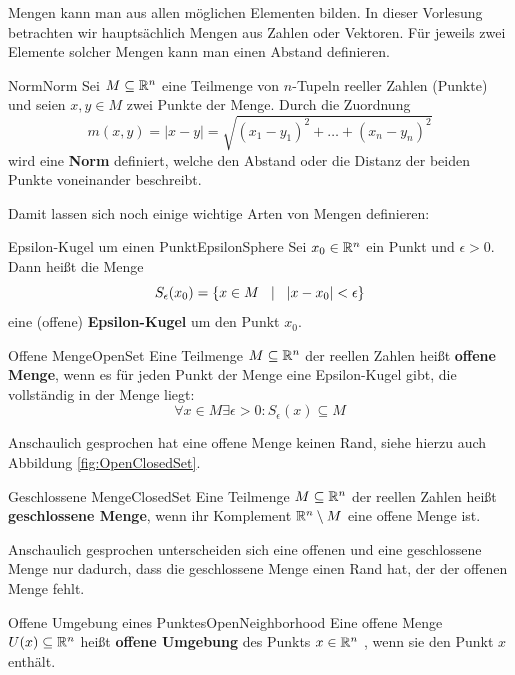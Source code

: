 Mengen kann man aus allen möglichen Elementen bilden. In dieser Vorlesung betrachten wir hauptsächlich Mengen aus Zahlen oder Vektoren. Für jeweils zwei Elemente solcher Mengen kann man einen Abstand definieren.

\begin{definition}{Norm}{Norm}
    Sei $M \subseteq \mathbb{R}^n$ eine Teilmenge von $n$-Tupeln reeller Zahlen (Punkte) und seien $x,y\in M$ zwei Punkte der Menge. Durch die Zuordnung
    $$
        m(x,y) = |x-y| = \sqrt{(x_1-y_1)^2 + \dots + (x_n-y_n)^2}
    $$
    wird eine \textbf{Norm} definiert, welche den Abstand oder die Distanz der beiden Punkte voneinander beschreibt.
\end{definition}

Damit lassen sich noch einige wichtige Arten von Mengen definieren:

\begin{definition}{Epsilon-Kugel um einen Punkt}{EpsilonSphere}
    Sei $x_0\in\mathbb{R}^n$ ein Punkt und $\epsilon > 0$. Dann heißt die Menge
    $$
        S_\epsilon(x_0) = \lbrace x \in M \hspace{3mm} | \hspace{3mm} |x-x_0| < \epsilon \rbrace
    $$
    eine (offene) \textbf{Epsilon-Kugel} um den Punkt $x_0$.
\end{definition}

\begin{definition}{Offene Menge}{OpenSet}
    Eine Teilmenge $M \subseteq \mathbb{R}^n$ der reellen Zahlen heißt \textbf{offene Menge}, wenn es für jeden Punkt der Menge eine Epsilon-Kugel gibt, die vollständig in der Menge liegt:
    $$
        \forall x \in M \exists \epsilon > 0: S_\epsilon(x) \subseteq M
    $$
\end{definition}

Anschaulich gesprochen hat eine offene Menge keinen Rand, siehe hierzu auch Abbildung \ref{fig:OpenClosedSet}.

\begin{definition}{Geschlossene Menge}{ClosedSet}
    Eine Teilmenge $M \subseteq \mathbb{R}^n$ der reellen Zahlen heißt \textbf{geschlossene Menge}, wenn ihr Komplement $\mathbb{R}^n \setminus M$ eine offene Menge ist.
\end{definition}

Anschaulich gesprochen unterscheiden sich eine offenen und eine geschlossene Menge nur dadurch, dass die geschlossene Menge einen Rand hat, der der offenen Menge fehlt.

\begin{definition}{Offene Umgebung eines Punktes}{OpenNeighborhood}
    Eine offene Menge $U(x) \subseteq \mathbb{R}^n$ heißt \textbf{offene Umgebung} des Punkts $x \in \mathbb{R}^n$ , wenn sie den Punkt $x$ enthält.
\end{definition}


